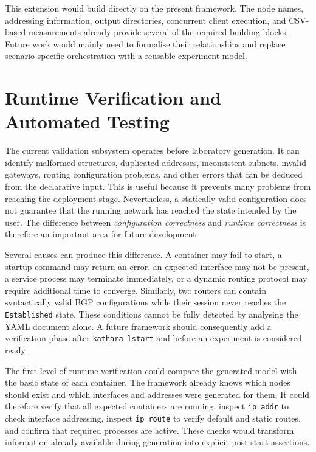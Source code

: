 This extension would build directly on the present framework. The node names,
addressing information, output directories, concurrent client execution, and
CSV-based measurements already provide several of the required building
blocks. Future work would mainly need to formalise their relationships and
replace scenario-specific orchestration with a reusable experiment model.

\section{Runtime Verification and Automated Testing}
\label{sec:future-runtime-verification}

The current validation subsystem operates before laboratory generation. It can
identify malformed structures, duplicated addresses, inconsistent subnets,
invalid gateways, routing configuration problems, and other errors that can be
deduced from the declarative input. This is useful because it prevents many
problems from reaching the deployment stage. Nevertheless, a statically valid
configuration does not guarantee that the running network has reached the
state intended by the user. The difference between \emph{configuration
correctness} and \emph{runtime correctness} is therefore an important area for
future development.

Several causes can produce this difference. A container may fail to start, a
startup command may return an error, an expected interface may not be present,
a service process may terminate immediately, or a dynamic routing protocol may
require additional time to converge. Similarly, two routers can contain
syntactically valid BGP configurations while their session never reaches the
\texttt{Established} state. These conditions cannot be fully detected by
analysing the YAML document alone. A future framework should consequently add
a verification phase after \texttt{kathara lstart} and before an experiment is
considered ready.

The first level of runtime verification could compare the generated model with
the basic state of each container. The framework already knows which nodes
should exist and which interfaces and addresses were generated for them. It
could therefore verify that all expected containers are running, inspect
\texttt{ip addr} to check interface addressing, inspect \texttt{ip route} to
verify default and static routes, and confirm that required processes are
active. These checks would transform information already available during
generation into explicit post-start assertions.

